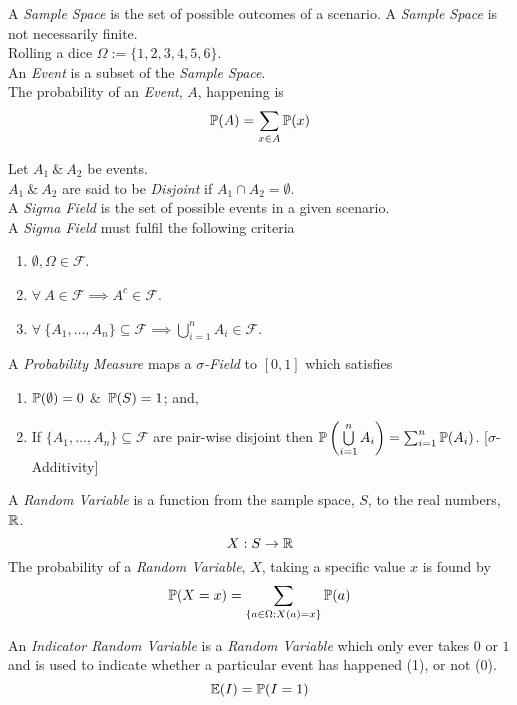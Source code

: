 \documentclass[11pt,a4paper]{article}
\begin{document}
A \textit{Sample Space} is the set of possible outcomes of a scenario. A \textit{Sample Space} is not necessarily finite.\\
\eg Rolling a dice $\Omega:=\{1,2,3,4,5,6\}$.\\

An \textit{Event} is a subset of the \textit{Sample Space}.\\
The probability of an \textit{Event}, $A$, happening is
$$\mathbb{P}(A)=\sum_{x\in A}\mathbb{P}(x)$$

Let $A_1\ \&\ A_2$ be events.\\
$A_1\ \&\ A_2$ are said to be \textit{Disjoint} if $A_1\cap A_2=\emptyset$.\\

A \textit{Sigma Field} is the set of possible events in a given scenario.\\
A \textit{Sigma Field} must fulfil the following criteria
\begin{enumerate}
	\item $\emptyset,\Omega\in\mathcal{F}$.
	\item $\forall\ A\in\mathcal{F}\implies A^c\in\mathcal{F}$.
	\item $\forall\ \{A_1,\dots,A_n\}\subseteq\mathcal{F}\implies\bigcup\limits_{i=1}^nA_i\in\mathcal{F}$.
\end{enumerate}

A \textit{Probability Measure} maps a \textit{$\sigma$-Field} to $[0,1]$ which satisfies
\begin{enumerate}
	\item $\mathbb{P}(\emptyset)=0$ \&\ $\mathbb{P}(S)=1$; and,
	\item If $\{A_1,\dots,A_n\}\subseteq\mathcal{F}$ are pair-wise disjoint then $\mathbb{P}\left(\bigcup\limits_{i=1}^nA_i\right)=\sum_{i=1}^n\mathbb{P}(A_i)$. [$\sigma$-Additivity]
\end{enumerate}

A \textit{Random Variable} is a function from the sample space, $S$, to the real numbers, $\mathbb{R}$.\\
$$X:S\to\mathbb{R}$$
The probability of a \textit{Random Variable}, $X$, taking a specific value $x$ is found by
$$\mathbb{P}(X=x)=\sum_{\{a\in \Omega:X(a)=x\}}\mathbb{P}(a)$$

An \textit{Indicator Random Variable} is a \textit{Random Variable} which only ever takes $0$ or $1$ and is used to indicate whether a particular event has happened (1), or not (0).
$$\mathbb{E}(I)=\mathbb{P}(I=1)$$
\end{document}
